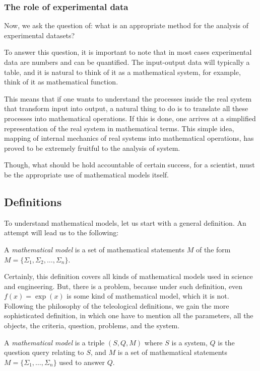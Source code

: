 \subsubsection{The role of experimental data}
Now, we ask the question of: what is an appropriate method for the analysis of experimental datasets? 

To answer this question, it is important to note that in most cases experimental data are numbers and can be quantified. The input-output data will typically a table, and it is natural to think of it as a mathematical system, for example, think of it as mathematical function. 

This means that if one wants to understand the processes inside the real system that transform input into output, a natural thing to do is to translate all these processes into mathematical operations. If this is done, one arrives at a simplified representation of the real system in mathematical terms. This simple idea, mapping of internal mechanics of real systems into mathematical operations, has proved to be extremely fruitful to the analysis of system. 

Though, what should be hold accountable of certain success, for a scientist, must be the appropriate use of mathematical models itself. 
\subsection{Definitions}
To understand mathematical models, let us start with a general definition. An attempt will lead us to the following: 
\begin{definition}
    A \textit{mathematical model} is a set of mathematical statements $M$ of the form $M=\{ \Sigma_{1},\Sigma_{2},\dots,\Sigma_{n} \}$. 
\end{definition}
Certainly, this definition covers all kinds of mathematical models used in science and engineering. But, there is a problem, because under such definition, even $f(x)=\exp{(x)}$ is some kind of mathematical model, which it is not. Following the philosophy of the teleological definitions, we gain the more sophisticated definition, in which one have to mention all the parameters, all the objects, the criteria, question, problems, and the system. 
\begin{definition}\label{def:mathematical_modelling}
    A \textit{mathematical model} is a triple $(S,Q,M)$ where $S$ is a system, $Q$ is the question query relating to $S$, and $M$ is a set of mathematical statements $M=\{ \Sigma_{1},\dots,\Sigma_{n} \}$ used to answer $Q$. 
\end{definition} 

